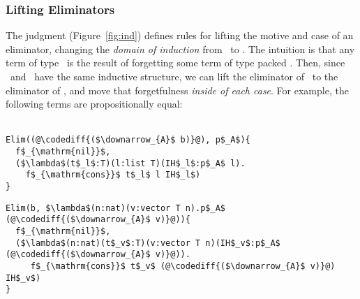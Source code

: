 \subsubsection{Lifting Eliminators}

The  judgment (Figure~\ref{fig:ind}) defines rules for lifting the motive and case of an
eliminator, changing the \textit{domain of induction} from \Aa\ to \B.
The intuition is that any term of type \Aa\ is the result of forgetting some term of type packed \B.
Then, since \Aa\ and \B\ have the same inductive structure, we can lift the eliminator of \Aa\ to the eliminator of \B,
and move that forgetfulness \textit{inside of each case}.
For example,
the following terms are propositionally equal:\vspace{-0.2cm}\\\\
\begin{minipage}{0.39\textwidth}
\begin{lstlisting}
Elim((@\codediff{($\downarrow_{A}$ b)}@), p$_A$){
  f$_{\mathrm{nil}}$,
  ($\lambda$(t$_l$:T)(l:list T)(IH$_l$:p$_A$ l).
    f$_{\mathrm{cons}}$ t$_l$ l IH$_l$)
}
\end{lstlisting}
\end{minipage}
\hspace{-0.2cm}
\begin{minipage}{0.61\textwidth}
\begin{lstlisting}
Elim(b, $\lambda$(n:nat)(v:vector T n).p$_A$ (@\codediff{($\downarrow_{A}$ v)}@)){
  f$_{\mathrm{nil}}$,
  ($\lambda$(n:nat)(t$_v$:T)(v:vector T n)(IH$_v$:p$_A$ (@\codediff{($\downarrow_{A}$ v)}@)).
     f$_{\mathrm{cons}}$ t$_v$ (@\codediff{($\downarrow_{A}$ v)}@) IH$_v$)
}
\end{lstlisting}
\end{minipage}

